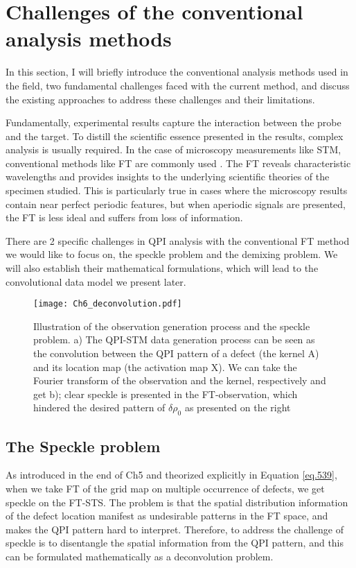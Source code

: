 \section{Challenges of the conventional analysis methods}
In this section, I will briefly introduce the conventional analysis methods used in the field, two fundamental challenges faced with the current method, and discuss the existing approaches to address these challenges and their limitations. 

Fundamentally, experimental results capture the interaction between the probe and the target. To distill the scientific essence presented in the results, complex analysis is usually required. In the case of microscopy measurements like STM, conventional methods like \ac{FT} are commonly used \cite{ardiniHighthroughputMultimodalWidefield2023}\cite{jaffeDifferenceFourierAnalysis1987}\cite{sciuttoFTNIRMicroscopyAdvanced2014}\cite{kimotoAssessmentLowervoltageTEM2012}. The \ac{FT} reveals characteristic wavelengths and provides insights to the underlying scientific theories of the specimen studied. This is particularly true in cases where the microscopy results contain near perfect periodic features, but when aperiodic signals are presented, the \ac{FT} is less ideal and suffers from loss of information. 

There are 2 specific challenges in QPI analysis with the conventional \ac{FT} method we would like to focus on, the speckle problem and the demixing problem. We will also establish their mathematical formulations, which will lead to the convolutional data model we present later. 

\begin{figure}
	\texttt{[image: Ch6\_deconvolution.pdf]} 
	\centering
	\caption{Illustration of the observation generation process and the speckle problem. a) The QPI-STM data generation process can be seen as the convolution between the QPI pattern of a defect (the kernel A) and its location map (the activation map X). We can take the Fourier transform of the observation and the kernel, respectively and get b); clear speckle is presented in the FT-observation, which hindered the desired pattern of $\delta\rho_0$ as presented on the right}
	\label{fig:ch6_decon}
\end{figure}

\subsection{The Speckle problem}
As introduced in the end of Ch5 and theorized explicitly in Equation \ref{eq.539}, when we take \ac{FT} of the grid map on multiple occurrence of defects, we get speckle on the \ac{FT-STS}. The problem is that the spatial distribution information of the defect location manifest as undesirable patterns in the \ac{FT} space, and makes the QPI pattern hard to interpret. Therefore, to address the challenge of speckle is to disentangle the spatial information from the \ac{QPI} pattern, and this can be formulated mathematically as a deconvolution problem. 

